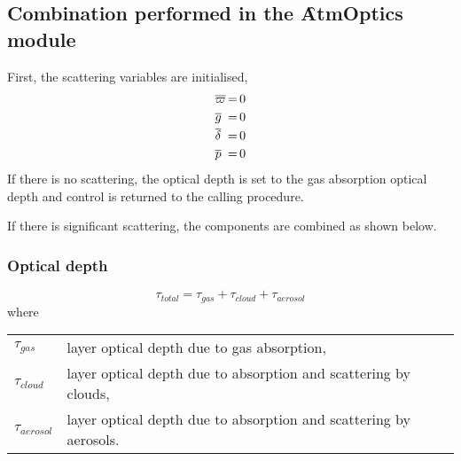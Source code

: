 \subsection{Combination performed in the \f{AtmOptics} module}

First, the scattering variables are initialised,
\begin{equation}
  \begin{array}{l@{\,=\,}l}
    \overline{\varpi} & 0\vspace{0.25em}\\
    \overline{g}      & 0\vspace{0.25em}\\
    \overline{\delta} & 0\vspace{0.25em}\\
    \overline{p}      & 0
  \end{array}
\end{equation}
If there is no scattering, the optical depth is set to the gas absorption optical depth and control is returned to the calling procedure.

If there is significant scattering, the components are combined as shown below.

\subsubsection{Optical depth}
\begin{equation}
  \tau_{total} = \tau_{gas} + \tau_{cloud} + \tau_{aerosol}
\end{equation}
where
\begin{tabular}{l@{ = }l}
  $\tau_{gas}$     & layer optical depth due to gas absorption,\\
  $\tau_{cloud}$   & layer optical depth due to absorption and scattering by clouds,\\
  $\tau_{aerosol}$ & layer optical depth due to absorption and scattering by aerosols.
\end{tabular}

